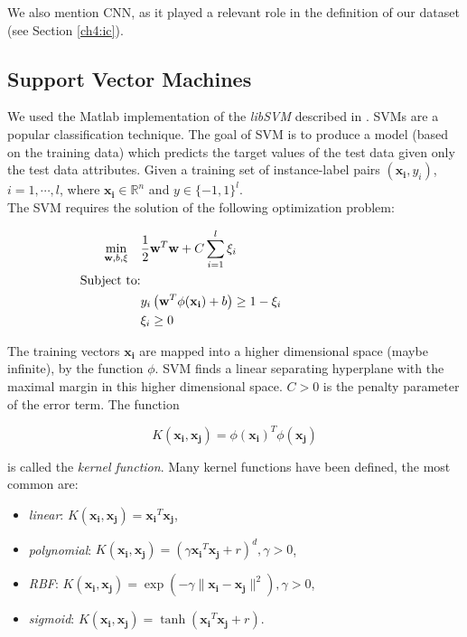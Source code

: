 We also mention \Gls{CNN}, as it played a relevant role in the definition of our dataset (see Section \ref{ch4:ic}).


\vspace{0.5cm}

\subsection{Support Vector Machines}
\label{ch4:svm}

We used the Matlab implementation of the \textit{libSVM} described in \cite{SVM01}. \Glspl{SVM} are a popular classification technique.
The goal of \Gls{SVM} is to produce a model (based on the training data) which predicts the target values of the test data
given only the test data attributes. Given a training set of instance-label pairs $(\mathbf{x_i}, y_i)$, $i = 1,\cdots,l$, where $\mathbf{x_i} \in \mathbb{R}^n$ and $y \in \{-1,1\}^l$.\\
The \Gls{SVM} requires the solution of the following optimization problem:

\begin{equation}
     \begin{aligned}
      \smash{\min_{\textbf{w},b,\xi}} \quad & \frac{1}{2}\textbf{w}^T\textbf{w}+C \sum_{i=1}^{l}\xi_i   \\
      \text{Subject to:} &\\
       & y_i \left(\textbf{w}^T \phi( \mathbf{x_i} ) +b\right) \geq 1-\xi_i \\
       & \xi_i \geq 0 
     \end{aligned}
     \phantom{\hspace{3cm}} %
\end{equation}

The training vectors $\mathbf{x_i}$ are mapped into a higher dimensional space (maybe infinite), by the function $\phi$.
\Gls{SVM} finds a linear separating hyperplane with the maximal margin in this higher dimensional space.
$C > 0$ is the penalty parameter of the error term.
The function

\begin{equation}
 K(\mathbf{x_i}, \mathbf{x_j}) = \phi(\mathbf{x_i})^T\phi(\mathbf{x_j})
\end{equation}

is called the \textit{kernel function}. Many kernel functions have been defined, the most common are:

\begin{itemize}
 \item \textit{linear}: $K(\mathbf{x_i}, \mathbf{x_j}) = \mathbf{x_i}^T\mathbf{x_j}$,
 \item \textit{polynomial}: $K(\mathbf{x_i}, \mathbf{x_j}) = \left(\gamma \mathbf{x_i}^T\mathbf{x_j} + r \right)^d, \gamma > 0$,
 \item \textit{\Gls{RBF}}: $K(\mathbf{x_i}, \mathbf{x_j}) = \exp{\left(-\gamma \lVert \mathbf{x_i} - \mathbf{x_j} \rVert^2 \right)}, \gamma > 0$,
 \item \textit{sigmoid}: $K(\mathbf{x_i}, \mathbf{x_j}) = \tanh \left( \mathbf{x_i}^T\mathbf{x_j} + r \right)$.
\end{itemize}

